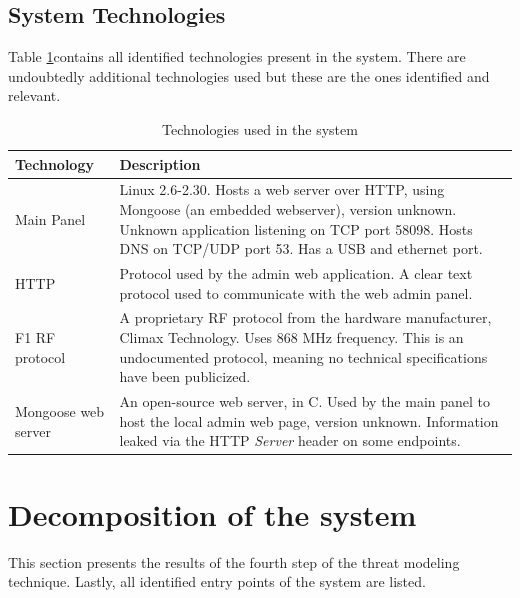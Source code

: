 \subsection{System Technologies}
Table \ref{tb:system-technologies}contains all identified technologies present in the system. There are undoubtedly additional technologies used but these are the ones identified and relevant.
\begin{table}[!ht]
    \centering
    \begin{tabularx}{\textwidth}{l X}
        \hline
        \textbf{Technology}  & \textbf{Description}
        \\ \hline
        Main Panel & Linux 2.6-2.30. Hosts a web server over HTTP, using Mongoose (an embedded webserver), version unknown. Unknown application listening on TCP port 58098. Hosts DNS on TCP/UDP port 53. Has a USB and ethernet port.
        \\ \hline
        HTTP  & Protocol used by the admin web application. A clear text protocol used to communicate with the web admin panel.
        \\ \hline
        F1 RF protocol  & A proprietary \gls{RF} protocol from the hardware manufacturer, Climax Technology. Uses 868 MHz frequency. This is an undocumented protocol, meaning no technical specifications have been publicized.
        \\ \hline
        Mongoose web server  & An open-source web server, in C. Used by the main panel to host the local admin web page, version unknown. Information leaked via the HTTP \textit{Server} header on some endpoints.
        \\ \hline
    \end{tabularx}
    \caption{Technologies used in the system}
    \label{tb:system-technologies}
\end{table}

\section{Decomposition of the system}
This section presents the results of the fourth step of the threat modeling technique. Lastly, all identified entry points of the system are listed.

